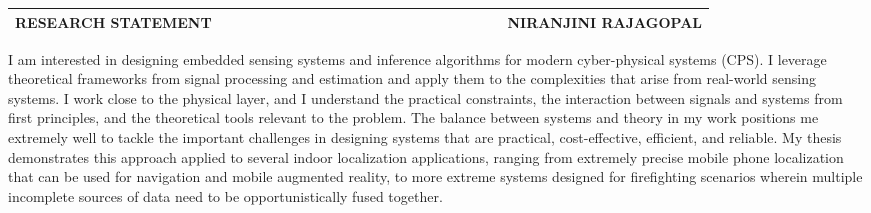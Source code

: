\documentclass[10pt]{article}
\date{}
\begin{document}


\begin{table}
\color{blue}
\begin{tabular*}{\textwidth}{l r}
\large\textbf{RESEARCH STATEMENT} & 
\hfill \ \ \ \ \ \ \ \ \ \ \ \ \ \ \ \ \ \ \ \
\ \ \ \ \ \ \ \ \ \ \ \ \ \ \
\large\textbf{NIRANJINI RAJAGOPAL}\\
\hline
\end{tabular*}

\end{table}
 
I am interested in designing  embedded sensing systems and inference algorithms for modern cyber-physical systems (CPS). 
I leverage theoretical frameworks from signal processing and estimation and apply them to the complexities that arise from real-world sensing systems. 
I work close to the physical layer, and I understand the practical constraints, the interaction between signals and systems from first principles, and the theoretical tools relevant to the problem. 
The balance between systems and theory in my work positions me extremely well to tackle the important challenges in designing systems that are practical, cost-effective, efficient, and reliable. My thesis demonstrates this approach applied to several indoor localization applications, ranging from extremely precise mobile phone localization that can be used for navigation and mobile augmented reality, to more extreme systems designed for firefighting scenarios wherein multiple incomplete sources of data need to be opportunistically fused together. 

\end{document}
